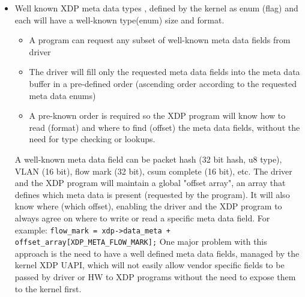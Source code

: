 \documentclass[letterpaper]{article}
\begin{document}
\begin{itemize}
	\item Well known XDP meta data types \cite{mlx-rx-accel-patches-2018} \cite{mlx-xdp-meta-patches-2018}, defined by the kernel as enum (flag) and each will have a well-known type(enum) size and format.

	\begin{itemize}
		\item A program can request any subset of well-known meta data fields from driver
		\item The driver will fill only the requested meta data fields into the meta data buffer in a pre-defined order (ascending order according to the requested meta data enums)
		\item A pre-known order is required so the XDP program will know how to read (format) and where to find (offset) the meta data fields, without the need for type checking or lookups.
	\end{itemize}
	A well-known meta data field can be packet hash (32 bit hash, u8 type), VLAN (16 bit), flow mark (32 bit), csum complete (16 bit), etc. 
	\newline
	\newline
	The driver and the XDP program will maintain a global "offset array", an array that defines which meta data is present (requested by the program).  It will also know where (which offset), enabling the driver and the XDP program to always agree on where to write or read a specific meta data field.  For example:
	\newline
	{\scriptsize \texttt{flow\_mark = xdp->data\_meta + offset\_array[XDP\_META\_FLOW\_MARK];}}
	\newline
	One major problem with this approach is the need to have a well defined meta data fields, managed by the kernel XDP UAPI, which will not easily allow vendor specific fields to be passed by driver or HW to XDP programs without the need to expose them to the kernel first.


\end{itemize}
\end{document}
